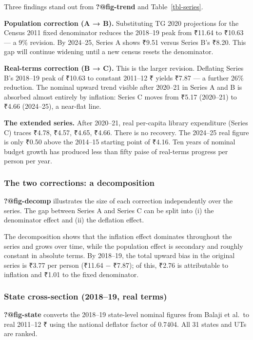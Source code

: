 \documentclass[
  11pt,
  oneside,
  10pt,
  a4paper,
  twocolumn]{article}
\begin{document}
Three findings stand out from \textbf{?@fig-trend} and
Table~\ref{tbl-series}.

\textbf{Population correction (A → B).} Substituting TG 2020 projections
for the Census 2011 fixed denominator reduces the 2018--19 peak from
₹11.64 to ₹10.63 --- a 9\% revision. By 2024--25, Series A shows ₹9.51
versus Series B's ₹8.20. This gap will continue widening until a new
census resets the denominator.

\textbf{Real-terms correction (B → C).} This is the larger revision.
Deflating Series B's 2018--19 peak of ₹10.63 to constant 2011--12 ₹
yields ₹7.87 --- a further 26\% reduction. The nominal upward trend
visible after 2020--21 in Series A and B is absorbed almost entirely by
inflation: Series C moves from ₹5.17 (2020--21) to ₹4.66 (2024--25), a
near-flat line.

\textbf{The extended series.} After 2020--21, real per-capita library
expenditure (Series C) traces ₹4.78, ₹4.57, ₹4.65, ₹4.66. There is no
recovery. The 2024--25 real figure is only ₹0.50 above the 2014--15
starting point of ₹4.16. Ten years of nominal budget growth has produced
less than fifty paise of real-terms progress per person per year.

\subsubsection{The two corrections: a
decomposition}\label{the-two-corrections-a-decomposition}

\textbf{?@fig-decomp} illustrates the size of each correction
independently over the series. The gap between Series A and Series C can
be split into (i) the denominator effect and (ii) the deflation effect.

The decomposition shows that the inflation effect dominates throughout
the series and grows over time, while the population effect is secondary
and roughly constant in absolute terms. By 2018--19, the total upward
bias in the original series is ₹3.77 per person (₹11.64 − ₹7.87); of
this, ₹2.76 is attributable to inflation and ₹1.01 to the fixed
denominator.

\subsubsection{State cross-section (2018--19, real
terms)}\label{state-cross-section-201819-real-terms}

\textbf{?@fig-state} converts the 2018--19 state-level nominal figures
from Balaji et al.~to real 2011--12 ₹ using the national deflator factor
of 0.7404. All 31 states and UTs are ranked.
\end{document}
